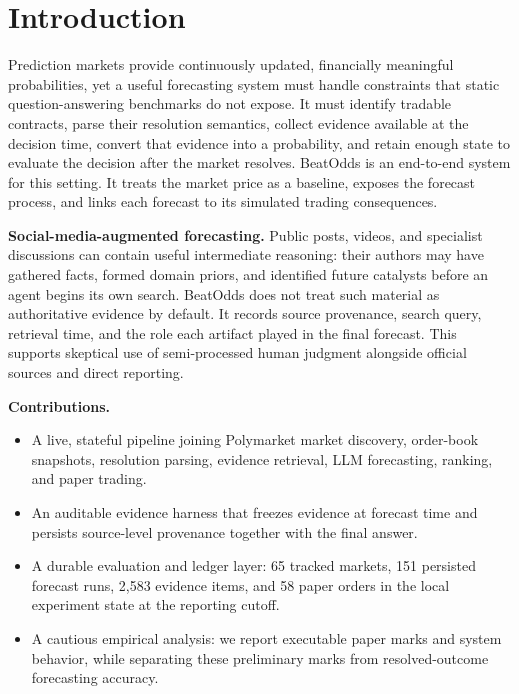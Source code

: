 \section{Introduction}

Prediction markets provide continuously updated, financially meaningful probabilities, yet a useful forecasting system must handle constraints that static question-answering benchmarks do not expose. It must identify tradable contracts, parse their resolution semantics, collect evidence available at the decision time, convert that evidence into a probability, and retain enough state to evaluate the decision after the market resolves. BeatOdds is an end-to-end system for this setting. It treats the market price as a baseline, exposes the forecast process, and links each forecast to its simulated trading consequences.

\textbf{Social-media-augmented forecasting.} Public posts, videos, and specialist discussions can contain useful intermediate reasoning: their authors may have gathered facts, formed domain priors, and identified future catalysts before an agent begins its own search. BeatOdds does not treat such material as authoritative evidence by default. It records source provenance, search query, retrieval time, and the role each artifact played in the final forecast. This supports skeptical use of semi-processed human judgment alongside official sources and direct reporting.

\textbf{Contributions.}
\begin{itemize}[leftmargin=*]
  \item A live, stateful pipeline joining Polymarket market discovery, order-book snapshots, resolution parsing, evidence retrieval, LLM forecasting, ranking, and paper trading.
  \item An auditable evidence harness that freezes evidence at forecast time and persists source-level provenance together with the final answer.
  \item A durable evaluation and ledger layer: 65 tracked markets, 151 persisted forecast runs, 2,583 evidence items, and 58 paper orders in the local experiment state at the reporting cutoff.
  \item A cautious empirical analysis: we report executable paper marks and system behavior, while separating these preliminary marks from resolved-outcome forecasting accuracy.
\end{itemize}

